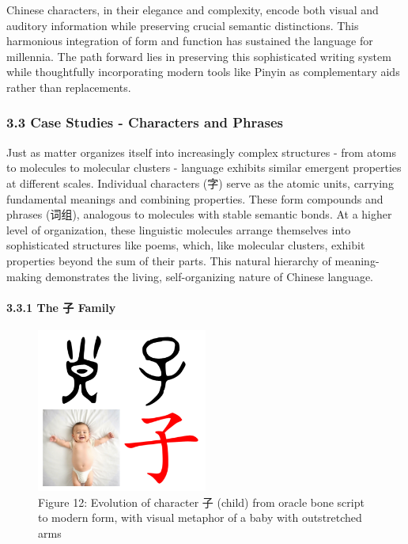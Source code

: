 \documentclass[
  11pt,
  letterpaper,
]{article}
\begin{document}
Chinese characters, in their elegance and complexity, encode both visual
and auditory information while preserving crucial semantic distinctions.
This harmonious integration of form and function has sustained the
language for millennia. The path forward lies in preserving this
sophisticated writing system while thoughtfully incorporating modern
tools like Pinyin as complementary aids rather than replacements.

\subsubsection{3.3 Case Studies - Characters and
Phrases}\label{case-studies---characters-and-phrases}

Just as matter organizes itself into increasingly complex structures -
from atoms to molecules to molecular clusters - language exhibits
similar emergent properties at different scales. Individual characters
(字) serve as the atomic units, carrying fundamental meanings and
combining properties. These form compounds and phrases (词组), analogous
to molecules with stable semantic bonds. At a higher level of
organization, these linguistic molecules arrange themselves into
sophisticated structures like poems, which, like molecular clusters,
exhibit properties beyond the sum of their parts. This natural hierarchy
of meaning-making demonstrates the living, self-organizing nature of
Chinese language.

\paragraph{3.3.1 The 子 Family}\label{the-ux5b50-family}

\begin{figure}
\centering
\includegraphics[width=0.5\textwidth]{./images/zi_child.png}

\caption{Figure 12: Evolution of character 子 (child) from oracle bone
script to modern form, with visual metaphor of a baby with outstretched
arms}

\end{figure}
\end{document}
